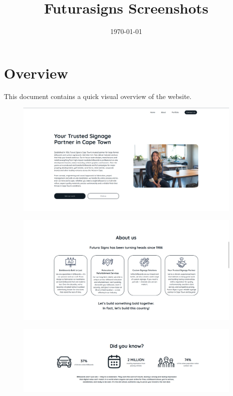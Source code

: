 \documentclass[11pt,a4paper]{article}
\begin{document}
\title{Futurasigns Screenshots}
\author{}
\date{\today}

\maketitle

\section*{Overview}
This document contains a quick visual overview of the website.

\begin{figure}[H]
	\centering
	\includegraphics[width=\textwidth]{./src/assets/screenshots/home.png}
\end{figure}
	\newpage

\begin{figure}[H]
	\centering
	\includegraphics[width=\textwidth]{./src/assets/screenshots/about.png}
\end{figure}
	\newpage

\begin{figure}[H]
	\centering
	\includegraphics[width=\textwidth]{./src/assets/screenshots/stats.png}
\end{figure}
	\newpage
\end{document}
